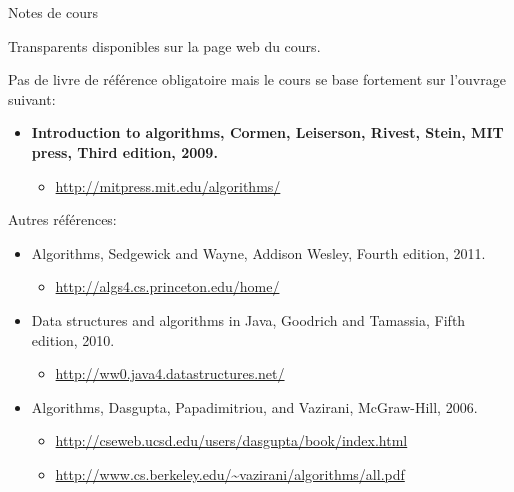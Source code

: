 \begin{frame}{Notes de cours}
\begin{itemize}
\item Transparents disponibles sur la page web du cours.
\item Pas de livre de référence obligatoire mais le cours se base fortement sur l'ouvrage suivant:
{\small
\begin{itemize}
\item {\bf Introduction to algorithms, Cormen, Leiserson, Rivest, Stein, MIT press, Third edition, 2009.}
\begin{itemize}
\item \url{http://mitpress.mit.edu/algorithms/}
\end{itemize}
\end{itemize}
\item Autres références:
\begin{itemize}
\item Algorithms, Sedgewick and Wayne, Addison Wesley, Fourth edition, 2011.
\begin{itemize}
\item \url{http://algs4.cs.princeton.edu/home/}
\end{itemize}
\item Data structures and algorithms in Java, Goodrich and Tamassia, Fifth edition, 2010.
\begin{itemize}
\item \url{http://ww0.java4.datastructures.net/}
\end{itemize}
\item Algorithms, Dasgupta, Papadimitriou, and Vazirani, McGraw-Hill, 2006.
\begin{itemize}
\item \url{http://cseweb.ucsd.edu/users/dasgupta/book/index.html}
\item \url{http://www.cs.berkeley.edu/~vazirani/algorithms/all.pdf}
\end{itemize}
\end{itemize}
}
\end{itemize}
\end{frame}

